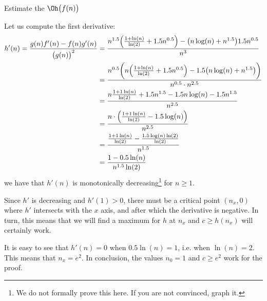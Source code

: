 \documentclass{practice}
\begin{document}
\begin{task}{Estimate the $\Oh\bigl(f(n)\bigr)$}
\begin{itemize}
    Let us compute the first derivative:
    \begin{align*}
      h'(n) = \frac{g(n)f'(n) - f(n)g'(n)}{\bigl(g(n)\bigr)^2}
      &= \frac{
        n^{1.5}\Bigl(\frac{1 + \ln(n)}{\ln(2)} + 1.5n^{0.5}\Bigr) -
        \bigl(n\log(n) + n^{1.5}\bigr)1.5n^{0.5}
      }
      {n^3}\\
      &= \frac{
        n^{0.5}\biggl(
          n\Bigl(\frac{1 + \ln(n)}{\ln(2)} + 1.5n^{0.5}\Bigr) -
          1.5\bigl(n\log(n) + n^{1.5}\bigr)
        \biggr)
      }
      {n^{0.5} \cdot n^{2.5}}\\
      &= \frac{
        n\frac{1 + 1\ln(n)}{\ln(2)} + 1.5n^{1.5} -
        1.5n\log(n) - 1.5n^{1.5}
      }
      {n^{2.5}}\\
      &= \frac{
        n \cdot \Bigl(
          \frac{1 + 1\ln(n)}{\ln(2)} - 1.5 \log(n)
        \Bigr)
      }{n^{2.5}}\\
      &= \frac{
        \frac{1 + 1\ln(n)}{\ln(2)} - \frac{1.5 \log(n)\ln(2)}{\ln(2)}
        }
      {n^{1.5}}\\
      &= \frac{1-0.5\ln(n)}{n^{1.5}\ln(2)}
    \end{align*}
    we have that $h'(n)$ is monotonically decreasing\footnote{We do not formally prove this here. If you are not convinced, graph it.} for $n\ge1$.

    Since $h'$ is decreasing and $h'(1)>0$, there must be a critical point $(n_x, 0)$ where $h'$ intersects with the $x$ axis, and after which the derivative is negative.
    In turn, this means that we will find a maximum for $h$ at $n_x$ and $c \ge h(n_x)$ will certainly work.

    It is easy to see that $h'(n)=0$ when $0.5\ln(n) = 1$, i.e. when $\ln(n) = 2$.
    This means that $n_x = e^2$.
    In conclusion, the values $n_0 = 1$ and $c \ge e^2$ work for the proof.
  \end{itemize}
\end{task}
\end{document}
